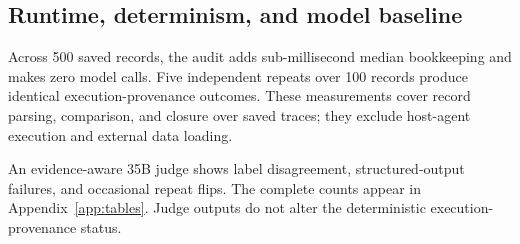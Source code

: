 \subsection{Runtime, determinism, and model baseline}
\label{sec:runtime}

Across 500 saved records, the audit adds sub-millisecond median
bookkeeping and makes zero model calls. Five independent repeats
over 100 records produce identical execution-provenance outcomes.
These measurements cover record parsing, comparison, and closure
over saved traces; they exclude host-agent execution and external
data loading.

An evidence-aware 35B judge shows label disagreement,
structured-output failures, and occasional repeat flips. The
complete counts appear in Appendix~\ref{app:tables}. Judge outputs
do not alter the deterministic execution-provenance status.

